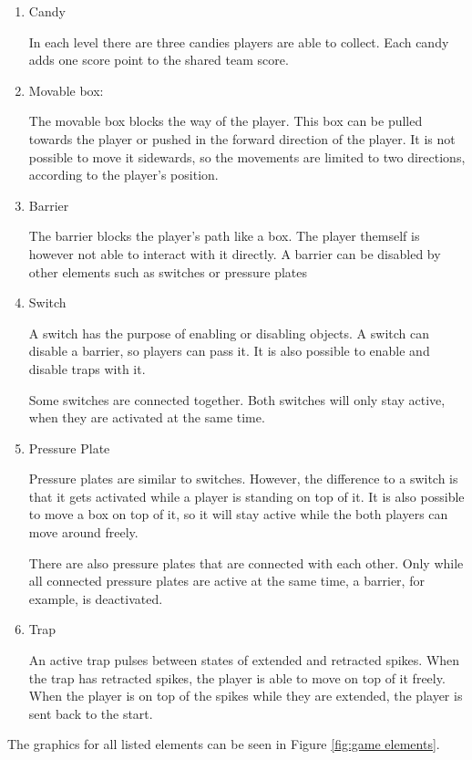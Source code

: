 \begin{enumerate}
    \item Candy
    
    In each level there are three candies players are able to collect. Each candy adds one score point to the shared team score.
    \item Movable box:   
    
    The movable box blocks the way of the player. This box can be pulled towards the player or pushed in the forward direction of the player. It is not possible to move it sidewards, so the movements are limited to two directions, according to the player's position.
    \item Barrier
    
    The barrier blocks the player's path like a box. The player themself is however not able to interact with it directly. A barrier can be disabled by other elements such as switches or pressure plates
    \item Switch
    
    A switch has the purpose of enabling or disabling objects. A switch can disable a barrier, so players can pass it.
    It is also possible to enable and disable traps with it.
    
    Some switches are connected together. Both switches will only stay active, when they are activated at the same time.
    \item Pressure Plate
    
    Pressure plates are similar to switches. However, the difference to a switch is that it gets activated while a player is standing on top of it. It is also possible to move a box on top of it, so it will stay active while the both players can move around freely.
    
    There are also pressure plates that are connected with each other. Only while all connected pressure plates are active at the same time, a barrier, for example, is deactivated.
    \item Trap
    
    An active trap pulses between states of extended and retracted spikes. When the trap has retracted spikes, the player is able to move on top of it freely. When the player is on top of the spikes while they are extended, the player is sent back to the start.
\end{enumerate}

The graphics for all listed elements can be seen in Figure \ref{fig:game elements}.

